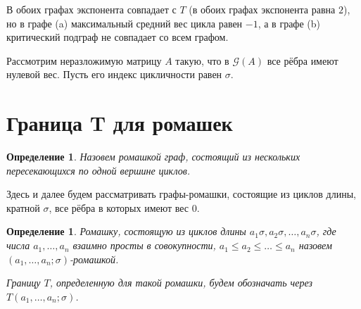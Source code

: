 \documentclass[12pt]{article}
\newtheorem{definition}[theorem]{Определение}
\begin{document}
\begin{figure}[h]%
    \centering
    \qquad
    \label{fig:example}%
\end{figure}

В обоих графах экспонента совпадает с $T$ (в обоих графах экспонента равна $2$), но в графе (a) максимальный средний вес цикла равен $-1$, а в графе (b) критический подграф не совпадает со всем графом.

Рассмотрим неразложимую матрицу $A$ такую, что в $\mathcal{G}(A)$ все рёбра имеют нулевой вес. Пусть его индекс цикличности равен $\sigma$.

\section{Граница T для ромашек}
\begin{definition} Назовем ромашкой граф, состоящий из нескольких пересекающихся по одной вершине циклов.
\end{definition}

Здесь и далее будем рассматривать графы-ромашки, состоящие из циклов длины, кратной $\sigma$, все рёбра в которых имеют вес $0$.

\begin{definition}
Ромашку, состоящую из циклов длины $a_1\sigma, a_2\sigma, \dots, a_n\sigma$, где числа $a_1, \dots, a_n$ взаимно просты в совокупности, $a_1\le a_2 \le \dots \le a_n$ назовем $(a_1, \dots, a_n; \sigma)$-ромашкой.

Границу $T$, определенную для такой ромашки, будем обозначать через $T(a_1, \dots, a_n; \sigma)$.
\end{definition}
\end{document}
